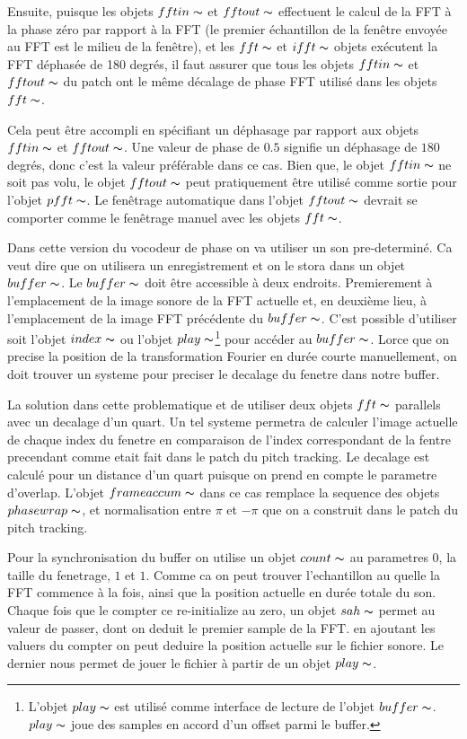 Ensuite, puisque les objets $fftin\thicksim$ et $fftout\thicksim$ effectuent le calcul de la FFT à la phase zéro par rapport à la FFT (le premier échantillon de la fenêtre envoyée au FFT est le milieu de la fenêtre), et les $fft\thicksim$ et $ifft\thicksim$ objets exécutent la FFT déphasée de 180 degrés, il faut assurer que tous les objets $fftin\thicksim$ et $fftout\thicksim$ du patch ont le même décalage de phase FFT utilisé dans les objets $fft\thicksim$.

Cela peut être accompli en spécifiant un déphasage par rapport aux objets $fftin\thicksim$ et $fftout\thicksim$. Une valeur de phase de $0.5$ signifie un déphasage de $180$ degrés, donc c'est la valeur préférable dans ce cas. Bien que, le objet $fftin\thicksim$ ne soit pas volu, le objet $fftout\thicksim$ peut pratiquement être utilisé comme sortie pour l'objet $pfft\thicksim$. Le fenêtrage automatique dans l'objet $fftout\thicksim$ devrait se comporter comme le fenêtrage manuel avec les objets $fft\thicksim$.

Dans cette version du vocodeur de phase on va utiliser un son pre-determiné. Ca veut dire que on utilisera un enregistrement et on le stora dans un objet $buffer\thicksim$. Le $buffer\thicksim$ doit être accessible à deux endroits. Premierement à l'emplacement de la image sonore de la FFT actuelle et, en deuxième lieu, à l'emplacement de la image FFT précédente du $buffer\thicksim$. C'est possible d'utiliser soit l'objet $index\thicksim$ ou l'objet $play\thicksim$\footnote{L'objet $play\thicksim$ est utilisé comme interface de lecture de l'objet $buffer\thicksim$. $play\thicksim$ joue des samples en accord d'un offset parmi le buffer.} pour accéder au $buffer\thicksim$. Lorce que on precise la position de la transformation Fourier en durée courte manuellement, on doit trouver un systeme pour preciser le decalage du fenetre dans notre buffer.

La solution dans cette problematique et de utiliser deux objets $fft\thicksim$ parallels avec un decalage d'un quart. Un tel systeme permetra de calculer l'image actuelle de chaque index du fenetre en comparaison de l'index correspondant de la fentre precendant comme etait fait dans le patch du pitch tracking. Le decalage est calculé pour un distance d'un quart puisque on prend en compte le parametre d'overlap. L'objet $frameaccum\thicksim$ dans ce cas remplace la sequence des objets $phasewrap\thicksim$, et normalisation entre $\pi$ et $-\pi$ que on a construit dans le patch du pitch tracking.

Pour la synchronisation du buffer on utilise un objet $count\thicksim$ au parametres $0$, la taille du fenetrage, $1$ et $1$. Comme ca on peut trouver l'echantillon au quelle la FFT commence à la fois, ainsi que la position actuelle en durée totale du son. Chaque fois que le compter ce re-initialize au zero, un objet $sah\thicksim$ permet au valeur de passer, dont on deduit le premier sample de la FFT. en ajoutant les valuers du compter on peut deduire la position actuelle sur le fichier sonore. Le dernier nous permet de jouer le fichier à partir de un objet $play\thicksim$. 

